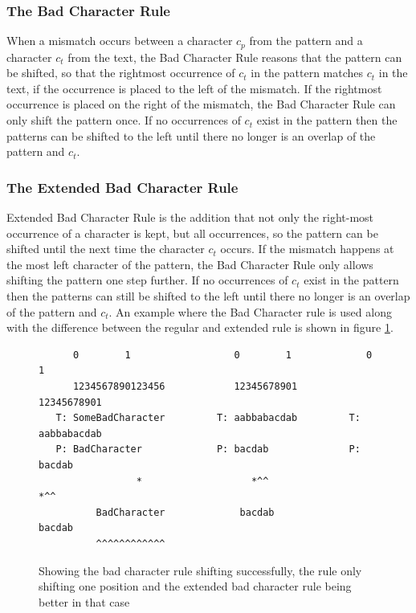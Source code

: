 \subsubsection{The Bad Character Rule}
When a mismatch occurs between a character $c_p$ from the pattern and a character $c_t$ from the text, the Bad Character Rule reasons that the pattern can be shifted, so that the rightmost occurrence of $c_t$ in the pattern matches $c_t$ in the text, if the occurrence is placed to the left of the mismatch. If the rightmost occurrence is placed on the right of the mismatch, the Bad Character Rule can only shift the pattern once. If no occurrences of $c_t$ exist in the pattern then the patterns can be shifted to the left until there no longer is an overlap of the pattern and $c_t$.

\subsubsection{The Extended Bad Character Rule}
Extended Bad Character Rule is the addition that not only the right-most occurrence of a character is kept, but all occurrences, so the pattern can be shifted until the next time the character $c_t$ occurs. If the mismatch happens at the most left character of the pattern, the Bad Character Rule only allows shifting the pattern one step further.  If no occurrences of $c_t$ exist in the pattern then the patterns can still be shifted to the left until there no longer is an overlap of the pattern and $c_t$. An example where the Bad Character rule is used along with the difference between the regular and extended rule is shown in figure \ref{fig:badcharacterrule_example}. 

\begin{figure}[t]
\begin{verbatim}
      0        1                  0        1             0        1      
      1234567890123456            12345678901            12345678901
   T: SomeBadCharacter         T: aabbabacdab         T: aabbabacdab
   P: BadCharacter             P: bacdab              P: bacdab          
                 *                   *^^                    *^^     
          BadCharacter             bacdab                   bacdab  
          ^^^^^^^^^^^^                                              
\end{verbatim}
\caption{Showing the bad character rule shifting successfully, the rule only shifting one position and the extended bad character rule being better in that case}
\label{fig:badcharacterrule_example}
\end{figure}

